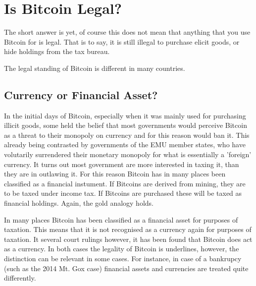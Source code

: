 
\chapter{Is Bitcoin Legal?}

The short answer is yet, of course this does not mean that anything
that you use Bitcoin for is legal. That is to say, it is still illegal
to purchase elicit goods, or hide holdings from the tax bureau.

The legal standing of Bitcoin is different in many countries. 


\section*{Currency or Financial Asset?}

In the initial days of Bitcoin, especially when it was mainly used
for purchasing illicit goods, some held the belief that most governments
would perceive Bitcoin as a threat to their monopoly on currency and
for this reason would ban it. This already being contrasted by governments
of the EMU member states, who have volutarily surrendered their monetary
monopoly for what is essentially a 'foreign' currency. It turns out
most government are more interested in taxing it, than they are in
outlawing it. For this reason Bitcoin has in many places been classified
as a financial instument. If Bitcoins are derived from mining, they
are to be taxed under income tax. If Bitcoins are purchased these
will be taxed as financial holdings. Again, the gold analogy holds.

In many places Bitcoin has been classified as a financial asset for
purposes of taxation. This means that it is not recognised as a currency
again for purposes of taxation. It several court rulings however,
it has been found that Bitcoin does act as a currency. In both cases
the legality of Bitcoin is underlines, however, the distinction can
be relevant in some cases. For instance, in case of a bankrupcy (such
as the 2014 Mt. Gox case) financial assets and currencies are treated
quite differently.
